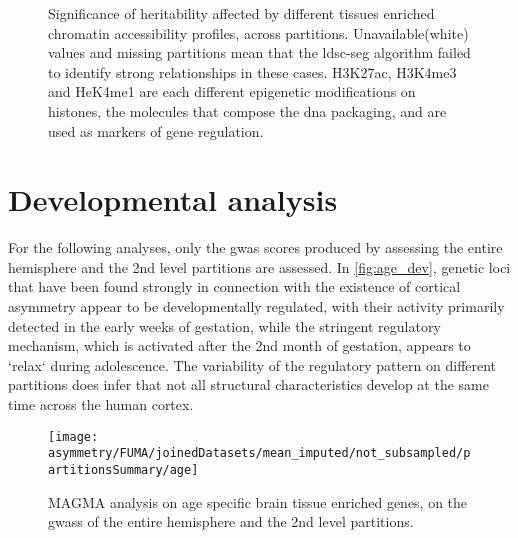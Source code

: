 \begin{figure}[H]
	\begin{adjustwidth}{-3cm}{-3cm}
	\centering
	
	\caption[LDSC-SEG assessment on variable chromatin accessibility]{Significance of heritability affected by different tissues enriched chromatin accessibility profiles, across partitions. Unavailable(white) values and missing partitions mean that the \ac{ldsc-seg} algorithm failed to identify strong relationships in these cases. H3K27ac, H3K4me3 and HeK4me1 are each different epigenetic modifications on histones, the molecules that compose the \ac{dna} packaging, and are used as markers of gene regulation.}
	\label{fig:ldsc-seg-chromatin}
	\end{adjustwidth}
\end{figure}
\section{Developmental analysis}
For the following analyses, only the \ac{gwas} scores produced by assessing the entire hemisphere and the 2nd level partitions are assessed. In \autoref{fig:age_dev}, genetic loci that have been found strongly in connection with the existence of cortical asymmetry appear to be developmentally regulated, with their activity primarily detected in the early weeks of gestation, while the stringent regulatory mechanism, which is activated after the 2nd month of gestation, appears to `relax` during adolescence. The variability of the regulatory pattern on different partitions does infer that not all structural characteristics develop at the same time across the human cortex.

\begin{figure}[H]
	\begin{adjustwidth}{-3cm}{-3cm}
	\centering
	\texttt{[image: asymmetry/FUMA/joinedDatasets/mean\_imputed/not\_subsampled/partitionsSummary/age]}
	\caption[Brain tissue specific age enriched genes analysis]{MAGMA analysis on age specific brain tissue enriched genes, on the \acp{gwas} of the entire hemisphere and the 2nd level partitions.}
	\label{fig:age_dev}
	\end{adjustwidth}
\end{figure}


